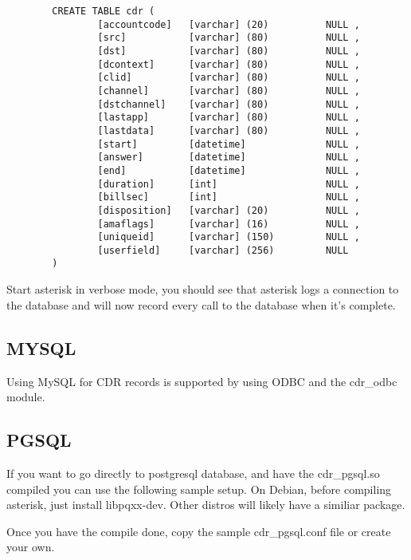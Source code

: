 \begin{astlisting}
\begin{verbatim}
		CREATE TABLE cdr (
		        [accountcode]   [varchar] (20)          NULL ,
		        [src]           [varchar] (80)          NULL ,
		        [dst]           [varchar] (80)          NULL ,
		        [dcontext]      [varchar] (80)          NULL ,
		        [clid]          [varchar] (80)          NULL ,
		        [channel]       [varchar] (80)          NULL ,
		        [dstchannel]    [varchar] (80)          NULL ,
		        [lastapp]       [varchar] (80)          NULL ,
		        [lastdata]      [varchar] (80)          NULL ,
		        [start]         [datetime]              NULL ,
		        [answer]        [datetime]              NULL ,
		        [end]           [datetime]              NULL ,
		        [duration]      [int]                   NULL ,
		        [billsec]       [int]                   NULL ,
		        [disposition]   [varchar] (20)          NULL ,
		        [amaflags]      [varchar] (16)          NULL ,
		        [uniqueid]      [varchar] (150)         NULL ,
		        [userfield]     [varchar] (256)         NULL
		)
\end{verbatim}
\end{astlisting}
                Start asterisk in verbose mode, you should see that asterisk
                logs a connection to the database and will now record every
                call to the database when it's complete.


\subsection{MYSQL}

Using MySQL for CDR records is supported by using ODBC and the cdr\_odbc module.

\subsection{PGSQL}
        If you want to go directly to postgresql database, and have the cdr\_pgsql.so
        compiled you can use the following sample setup.
        On Debian, before compiling asterisk, just install libpqxx-dev.
        Other distros will likely have a similiar package.

        Once you have the compile done,
        copy the sample cdr\_pgsql.conf file or create your own.

